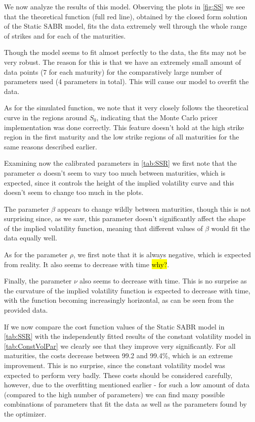 We now analyze the results of this model. Observing the plots in \autoref{fig:SS} we see that the theoretical function (full red line), obtained by the closed form solution of the Static SABR model, fits the data extremely well through the whole range of strikes and for each of the maturities.

Though the model seems to fit almost perfectly to the data, the fits may not be very robust. The reason for this is that we have an extremely small amount of data points (7 for each maturity) for the comparatively large number of parameters used (4 parameters in total). This will cause our model to overfit the data.

As for the simulated function, we note that it very closely follows the theoretical curve in the regions around $S_0$, indicating that the Monte Carlo pricer implementation was done correctly. This feature doesn't hold at the high strike region in the first maturity and the low strike regions of all maturities for the same reasons described earlier.

Examining now the calibrated parameters in \autoref{tab:SSR} we first note that the parameter $\alpha$ doesn't seem to vary too much between maturities, which is expected, since it controls the height of the implied volatility curve and this doesn't seem to change too much in the plots.

The parameter $\beta$ appears to change wildly between maturities, though this is not surprising since, as we saw, this parameter doesn't significantly affect the shape of the implied volatility function, meaning that different values of $\beta$ would fit the data equally well.

As for the parameter $\rho$, we first note that it is always negative, which is expected from reality. It also seems to decrease with time \hl{why?}.

Finally, the parameter $\nu$ also seems to decrease with time. This is no surprise as the curvature of the implied volatility function is expected to decrease with time, with the function becoming increasingly horizontal, as can be seen from the provided data.


If we now compare the cost function values of the Static SABR model in \autoref{tab:SSR} with the independently fitted results of the constant volatility model in \autoref{tab:ConstVolPar} we clearly see that they improve very significantly. For all maturities, the costs decrease between 99.2 and 99.4\%, which is an extreme improvement. This is no surprise, since the constant volatility model was expected to perform very badly. These costs should be considered carefully, however, due to the overfitting mentioned earlier - for such a low amount of data (compared to the high number of parameters) we can find many possible combinations of parameters that fit the data as well as the parameters found by the optimizer.


